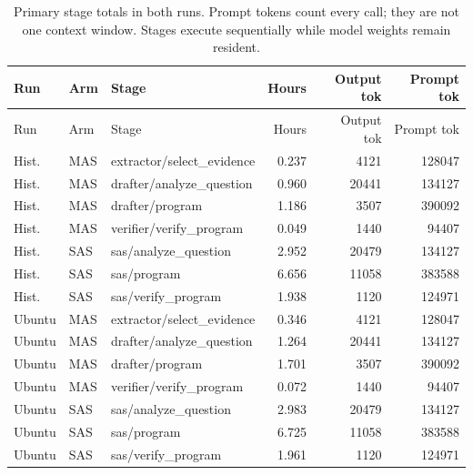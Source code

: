 {\small\setlength{\tabcolsep}{3pt}\begin{longtable}{llp{}rrr}
\caption{Primary stage totals in both runs. Prompt tokens count every call; they are not one context window. Stages execute sequentially while model weights remain resident.}\label{tab:stages}\\
Run & Arm & Stage & Hours & Output tok & Prompt tok\\\toprule\endfirsthead
Run & Arm & Stage & Hours & Output tok & Prompt tok\\\toprule\endhead
Hist. & MAS & extractor/select\_evidence & 0.237 & 4121 & 128047\\
Hist. & MAS & drafter/analyze\_question & 0.960 & 20441 & 134127\\
Hist. & MAS & drafter/program & 1.186 & 3507 & 390092\\
Hist. & MAS & verifier/verify\_program & 0.049 & 1440 & 94407\\
Hist. & SAS & sas/analyze\_question & 2.952 & 20479 & 134127\\
Hist. & SAS & sas/program & 6.656 & 11058 & 383588\\
Hist. & SAS & sas/verify\_program & 1.938 & 1120 & 124971\\
Ubuntu & MAS & extractor/select\_evidence & 0.346 & 4121 & 128047\\
Ubuntu & MAS & drafter/analyze\_question & 1.264 & 20441 & 134127\\
Ubuntu & MAS & drafter/program & 1.701 & 3507 & 390092\\
Ubuntu & MAS & verifier/verify\_program & 0.072 & 1440 & 94407\\
Ubuntu & SAS & sas/analyze\_question & 2.983 & 20479 & 134127\\
Ubuntu & SAS & sas/program & 6.725 & 11058 & 383588\\
Ubuntu & SAS & sas/verify\_program & 1.961 & 1120 & 124971\\
\bottomrule\end{longtable}}